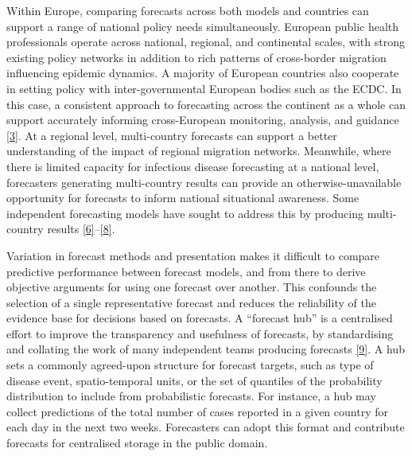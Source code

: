 \documentclass[
]{article}
\begin{document}
Within Europe, comparing forecasts across both models and countries can support a range of national policy needs simultaneously. European public health professionals operate across national, regional, and continental scales, with strong existing policy networks in addition to rich patterns of cross-border migration influencing epidemic dynamics. A majority of European countries also cooperate in setting policy with inter-governmental European bodies such as the ECDC. In this case, a consistent approach to forecasting across the continent as a whole can support accurately informing cross-European monitoring, analysis, and guidance \protect\hyperlink{ref-europeancentrefordiseasepreventionandcontrolForecastingCOVID19Cases2021}{{[}3{]}}. At a regional level, multi-country forecasts can support a better understanding of the impact of regional migration networks. Meanwhile, where there is limited capacity for infectious disease forecasting at a national level, forecasters generating multi-country results can provide an otherwise-unavailable opportunity for forecasts to inform national situational awareness. Some independent forecasting models have sought to address this by producing multi-country results \protect\hyperlink{ref-aguasModellingCOVID19Pandemic2020}{{[}6{]}}--\protect\hyperlink{ref-agostoMonitoringCOVID19Contagion2021}{{[}8{]}}.

Variation in forecast methods and presentation makes it difficult to compare predictive performance between forecast models, and from there to derive objective arguments for using one forecast over another. This confounds the selection of a single representative forecast and reduces the reliability of the evidence base for decisions based on forecasts. A ``forecast hub'' is a centralised effort to improve the transparency and usefulness of forecasts, by standardising and collating the work of many independent teams producing forecasts \protect\hyperlink{ref-reichCollaborativeMultiyearMultimodel2019}{{[}9{]}}. A hub sets a commonly agreed-upon structure for forecast targets, such as type of disease event, spatio-temporal units, or the set of quantiles of the probability distribution to include from probabilistic forecasts. For instance, a hub may collect predictions of the total number of cases reported in a given country for each day in the next two weeks. Forecasters can adopt this format and contribute forecasts for centralised storage in the public domain.
\end{document}
